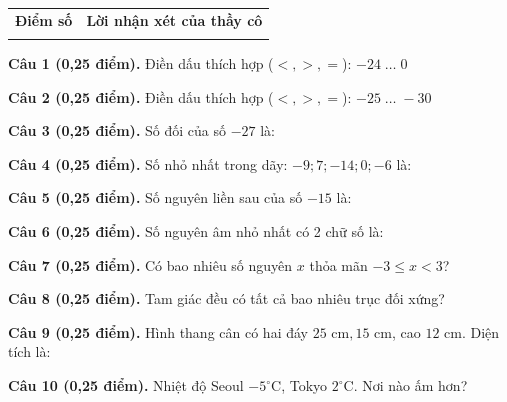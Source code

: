 \documentclass[12pt,a4paper]{article}
\begin{document}
\vspace{1.0mm}

\noindent
\begin{tabularx}{\linewidth}{|p{3.2cm}|X|}
\hline
\centering\textbf{Điểm số} & \centering\textbf{Lời nhận xét của thầy cô} \tabularnewline
\rule{0pt}{1.8cm} & \\
\hline
\end{tabularx}

\vspace{1.0mm}

\noindent\textbf{Câu 1 (0,25 điểm).} Điền dấu thích hợp ($<, >, =$): $-24 \; \dots \; 0$ \shortans{$<$}\par\vspace{0.25mm}
\noindent\textbf{Câu 2 (0,25 điểm).} Điền dấu thích hợp ($<, >, =$): $-25 \; \dots \; -30$ \shortans{$>$}\par\vspace{0.25mm}
\noindent\textbf{Câu 3 (0,25 điểm).} Số đối của số $-27$ là: \par\vspace{0.25mm}
\noindent\textbf{Câu 4 (0,25 điểm).} Số nhỏ nhất trong dãy: $-9; 7; -14; 0; -6$ là: \par\vspace{0.25mm}
\noindent\textbf{Câu 5 (0,25 điểm).} Số nguyên liền sau của số $-15$ là: \par\vspace{0.25mm}
\noindent\textbf{Câu 6 (0,25 điểm).} Số nguyên âm nhỏ nhất có 2 chữ số là: \par\vspace{0.25mm}
\noindent\textbf{Câu 7 (0,25 điểm).} Có bao nhiêu số nguyên $x$ thỏa mãn $-3 \le x < 3$? \par\vspace{0.25mm}
\noindent\textbf{Câu 8 (0,25 điểm).} Tam giác đều có tất cả bao nhiêu trục đối xứng? \par\vspace{0.25mm}
\noindent\textbf{Câu 9 (0,25 điểm).} Hình thang cân có hai đáy $25\text{ cm}, 15\text{ cm}$, cao $12\text{ cm}$. Diện tích là: \par\vspace{0.25mm}
\noindent\textbf{Câu 10 (0,25 điểm).} Nhiệt độ Seoul $-5^\circ\text{C}$, Tokyo $2^\circ\text{C}$. Nơi nào ấm hơn? \par\vspace{0.25mm}
\end{document}
